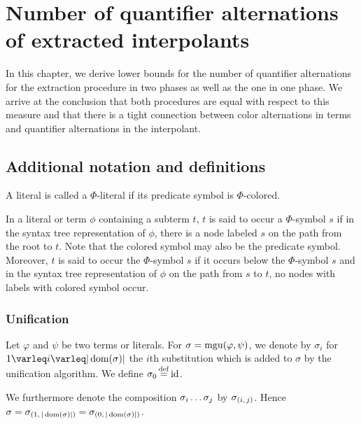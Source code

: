 \documentclass[%
	draft=false,%
	numbers=noendperiod,%
	11pt,%
	a4paper,%
	oneside,%
	openany,%
]{memoir}
\begin{document}
\chapter{ Number of quantifier alternations of extracted interpolants }

In this chapter, we derive lower bounds for the number of quantifier alternations for the extraction procedure in two phases as well as the one in one phase.
We arrive at the conclusion that both procedures are equal with respect to this measure and that there is a tight connection between color alternations in terms and quantifier alternations in the interpolant.



\section{Additional notation and definitions}

A literal is called a $\Phi$-literal if its predicate symbol is $\Phi$-colored.

In a literal or term $\phi$ containing a subterm $t$, $t$ is said to occur  a $\Phi$-symbol $s$ if in the syntax tree representation of $\phi$, there is a node labeled $s$ on the path from the root to $t$. Note that the colored symbol may also be the predicate symbol.
Moreover, $t$ is said to occur  the $\Phi$-symbol $s$ if it occurs below the $\Phi$-symbol $s$ and in the syntax tree representation of $\phi$ on the path from $s$ to $t$, no nodes with labels with colored symbol occur.


\subsection{Unification}

Let $\varphi$ and $\psi$ be two terms or literals.
For $\sigma = \operatorname{mgu}(\varphi, \psi)$, we denote by $\sigma_i$ for $1\varleq i \varleq |\dom(\sigma)|$ the $i$th substitution which is added to $\sigma$ by the unification algorithm.
We define $\sigma_0 \defeq \id$.

We furthermore denote the composition $\sigma_i \dots \sigma_j$ by $\sigma_{(i,\,j)}$.
Hence $\sigma = \sigma_{(1,\,|\operatorname{dom}(\sigma)|)} = \sigma_{(0,\,|\operatorname{dom}(\sigma)|)}$.
\end{document}
